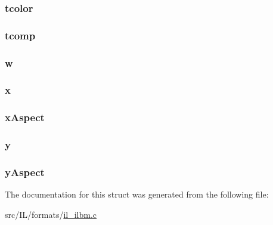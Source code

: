 \hypertarget{struct_b_m_h_d_a496156f3b6a8f5111489a4e3a1189cde}{
\subsubsection[{tcolor}]{ tcolor}}\label{struct_b_m_h_d_a496156f3b6a8f5111489a4e3a1189cde}
\hypertarget{struct_b_m_h_d_a0d153200c2b9b7803fc77cff5c1c3f37}{
\subsubsection[{tcomp}]{ tcomp}}\label{struct_b_m_h_d_a0d153200c2b9b7803fc77cff5c1c3f37}
\hypertarget{struct_b_m_h_d_afe8d0ba55b6dfa9b92e8fd55e9cad81f}{
\subsubsection[{w}]{ w}}\label{struct_b_m_h_d_afe8d0ba55b6dfa9b92e8fd55e9cad81f}
\hypertarget{struct_b_m_h_d_a8056f1981e13496dbb9b2ca184223b27}{
\subsubsection[{x}]{ x}}\label{struct_b_m_h_d_a8056f1981e13496dbb9b2ca184223b27}
\hypertarget{struct_b_m_h_d_a37b98613fa29d5c405698a709d4940a7}{
\subsubsection[{x\-Aspect}]{ x\-Aspect}}\label{struct_b_m_h_d_a37b98613fa29d5c405698a709d4940a7}
\hypertarget{struct_b_m_h_d_a5a8f8a453c9ee9e3e00eb84f2cfbd059}{
\subsubsection[{y}]{ y}}\label{struct_b_m_h_d_a5a8f8a453c9ee9e3e00eb84f2cfbd059}
\hypertarget{struct_b_m_h_d_a0e869e0f77388aaee790b3f51baf739b}{
\subsubsection[{y\-Aspect}]{ y\-Aspect}}\label{struct_b_m_h_d_a0e869e0f77388aaee790b3f51baf739b}


The documentation for this struct was generated from the following file\-:\begin{DoxyCompactItemize}
\item 
src/\-I\-L/formats/\hyperlink{il__ilbm_8c}{il\-\_\-ilbm.\-c}\end{DoxyCompactItemize}
